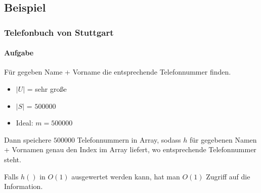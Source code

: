 \subsection{Beispiel}
\subsubsection*{Telefonbuch von Stuttgart}
\paragraph*{Aufgabe} Für gegeben Name + Vorname die entsprechende Telefonnummer finden.
\begin{itemize}
	\item $|U|$ = sehr große
	\item $|S|$ = $500 000$
	\item Ideal: $m = 500 000$
\end{itemize}
Dann speichere $500 000$ Telefonnummern in Array, sodass $h$ für gegebenen Namen + Vornamen genau den Index im Array liefert, wo entsprechende Telefonnummer steht.

\par\medskip
Falls $h()$ in $O(1)$ ausgewertet werden kann, hat man $O(1)$ Zugriff auf die Information.\par\medskip